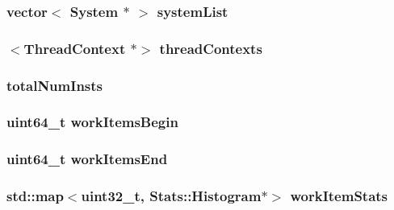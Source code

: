\label{classSystem_a0bb92fde095f717f1a9709fa16825091}
\hypertarget{classSystem_a2ccf318c5f6beb8a1697389782c1f2bf}{
\subsubsection[{systemList}]{\setlength{\rightskip}{0pt plus 5cm}vector$<$ {\bf System} $\ast$ $>$ {\bf systemList}}}
\label{classSystem_a2ccf318c5f6beb8a1697389782c1f2bf}
\hypertarget{classSystem_a19840a204c4d6f67b45a07073e8b41df}{
\subsubsection[{threadContexts}]{$<${\bf ThreadContext} $\ast$$>$ {\bf threadContexts}}}
\label{classSystem_a19840a204c4d6f67b45a07073e8b41df}
\hypertarget{classSystem_ac59cc9ac6419c90b7add2f0dff8babc9}{
\subsubsection[{totalNumInsts}]{ {\bf totalNumInsts}}}
\label{classSystem_ac59cc9ac6419c90b7add2f0dff8babc9}
\hypertarget{classSystem_a479aaf1a4cb34f2bbdd533b4fb8ef412}{
\subsubsection[{workItemsBegin}]{\setlength{\rightskip}{0pt plus 5cm}uint64\_\-t {\bf workItemsBegin}}}
\label{classSystem_a479aaf1a4cb34f2bbdd533b4fb8ef412}
\hypertarget{classSystem_a94de121bcd10e5fae1e1aadd6b4ab41b}{
\subsubsection[{workItemsEnd}]{\setlength{\rightskip}{0pt plus 5cm}uint64\_\-t {\bf workItemsEnd}}}
\label{classSystem_a94de121bcd10e5fae1e1aadd6b4ab41b}
\hypertarget{classSystem_a55a97611b6d940c8f1a15c49293ab7c7}{
\subsubsection[{workItemStats}]{\setlength{\rightskip}{0pt plus 5cm}std::map$<${\bf uint32\_\-t}, {\bf Stats::Histogram}$\ast$$>$ {\bf workItemStats}}}
\label{classSystem_a55a97611b6d940c8f1a15c49293ab7c7}


